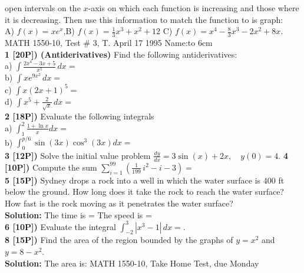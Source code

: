 \documentclass[12pt]{article}
\begin{document}
open intervals on the $x$-axis on which each function
is increasing and those where it is decreasing. Then use
this information to match the function to
is graph:
\\ %
A) $\displaystyle{f(x) = xe^x }$,\hfill B) $\displaystyle{f(x) =
\frac{1}{3}x^3+x^2+12}$
\hfill
C) $\displaystyle{f(x) = x^4-\frac{8}{3}x^3-2x^2+8x}$.
MATH 1550-10, Test \# 3, T. April 17 1995
\hfill Name:\hbox to 6cm{\hrulefill}
\\ %
{\bf 1 [20P]) (Antiderivatives)}  Find the following 
antiderivatives:
\\ %
a) $\displaystyle{\int \frac{2x^4 - 3x + 5}{x^5}\, dx 
=}$
\\ %
b) $\displaystyle{\int x e^{9x^2}\, dx=}$
\\ %
c) $\displaystyle{\int x(2x + 1)^5 =}$
\\ %
d) $\displaystyle{\int x^5 + \frac{2}{\sqrt{x}}\, dx = }$
\\ %
{\bf 2 [18P])} Evaluate the following integrals
\\ %
a) $ \displaystyle{\int_1^2\frac{1 + \ln x}{x}dx=}$
\\
b) $\displaystyle{\int_{0}^{p /6} \sin (3x) \cos^3 (3x)dx =}$
\\ %
{\bf 3 [12P])} Solve the initial value problem
$\displaystyle{\frac{dy}{dx} = 3 \sin (x) + 2x,\quad y(0) = 4}$.
{\bf 4 [10P])} Compute the sum
$\displaystyle{\sum_{i=1}^{99}\left(\frac{1}{199}\, i^2 -i - 
3\right)}=$
\\ %
{\bf 5 [15P])} Sydney drops a rock into a well in
which the water surface is $400$ ft below the ground. How long
does it take the rock to reach the water surface? How fast is the
rock moving as it penetrates the water surface? 
\\ %
{\bf Solution:} The time is =  \dotfill \hfill The speed is = 
\dotfill 
\\ %
{\bf 6 [10P])} Evaluate the integral
$\displaystyle{\int_{-2}^{3} |x^3-1|\, dx = }$.
\\ %
{\bf 8 [15P])}  Find the area of the region bounded by the
graphs of $y=x^2$ and $y=8-x^2$.
\\ %
{\bf Solution:} The area is: 
MATH 1550-10, Take Home Test, due Monday\\
\end{document}
